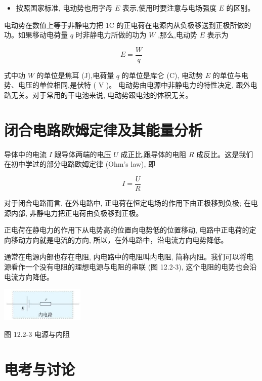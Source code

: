 \documentclass[10pt]{article}
\begin{document}
\begin{mdframed}

\begin{itemize}
\item 按照国家标准, 电动势也用字母 \(E\) 表示,使用时要注意与电场强度 \(E\) 的区别。
\end{itemize}

\end{mdframed}

电动势在数值上等于非静电力把 \(1\mathrm{C}\) 的正电荷在电源内从负极移送到正极所做的功。如果移动电荷量 \(q\) 时非静电力所做的功为 \(W\) ,那么,电动势 \(E\) 表示为

\[
E = \frac{W}{q}
\]

式中功 \(W\) 的单位是焦耳 (J),电荷量 \(q\) 的单位是库仑 (C), 电动势 \(E\) 的单位与电势、电压的单位相同,是伏特 ( V )。 电动势由电源中非静电力的特性决定, 跟外电路无关。对于常用的干电池来说, 电动势跟电池的体积无关。

\section*{闭合电路欧姆定律及其能量分析}

导体中的电流 \(I\) 跟导体两端的电压 \(U\) 成正比,跟导体的电阻 \(R\) 成反比。这是我们在初中学过的部分电路欧姆定律 (Ohm's law), 即

\[
I = \frac{U}{R}
\]

对于闭合电路而言, 在外电路中, 正电荷在恒定电场的作用下由正极移到负极; 在电源内部, 非静电力把正电荷由负极移到正极。

正电荷在静电力的作用下从电势高的位置向电势低的位置移动, 电路中正电荷的定向移动方向就是电流的方向, 所以，在外电路中，沿电流方向电势降低。

通常在电源内部也存在电阻, 内电路中的电阻叫内电阻, 简称内阻。我们可以将电源看作一个没有电阻的理想电源与电阻的串联 (图 12.2-3), 这个电阻的电势也会沿电流方向降低。

\begin{center}
\includegraphics[max width=0.3\textwidth]{images/01911d5f-8e38-70c0-b5b8-2b399bd115b6_90_193222.jpg}
\end{center}

图 12.2-3 电源与内阻

\section*{电考与讨论}
\end{document}
